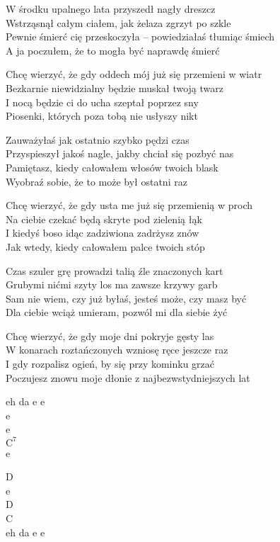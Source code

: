 \begin{text}
    \small{
    \hfill\break
W środku upalnego lata przyszedł nagły dreszcz\\
Wstrząsnął całym ciałem, jak żelaza zgrzyt po szkle\\
Pewnie śmierć cię przeskoczyła – powiedziałaś tłumiąc śmiech\\
A ja poczułem, że to mogła być naprawdę śmierć

Chcę wierzyć, że gdy oddech mój już się przemieni w wiatr\\
Bezkarnie niewidzialny będzie muskał twoją twarz\\
I nocą będzie ci do ucha szeptał poprzez sny\\
Piosenki, których poza tobą nie usłyszy nikt

Zauważyłaś jak ostatnio szybko pędzi czas\\
Przyspieszył jakoś nagle, jakby chciał się pozbyć nas\\
Pamiętasz, kiedy całowałem włosów twoich blask\\
Wyobraź sobie, że to może był ostatni raz

Chcę wierzyć, że gdy usta me już się przemienią w proch\\
Na ciebie czekać będą skryte pod zielenią łąk\\
I kiedyś boso idąc zadziwiona zadrżysz znów\\
Jak wtedy, kiedy całowałem palce twoich stóp

Czas szuler grę prowadzi talią źle znaczonych kart\\
Grubymi nićmi szyty los ma zawsze krzywy garb\\
Sam nie wiem, czy już byłaś, jesteś może, czy masz być\\
Dla ciebie wciąż umieram, pozwól mi dla siebie żyć

Chcę wierzyć, że gdy moje dni pokryje gęsty las\\
W konarach roztańczonych wzniosę ręce jeszcze raz\\
I gdy rozpalisz ogień, by się przy kominku grzać\\
Poczujesz znowu moje dłonie z najbezwstydniejszych lat
    }
\end{text}
\begin{chord}
    \small{
    eh da e e\\
    e\\
    e\\
    $\mathrm{C^7}$\\
    \hfill\break
    e

    D\\
    e\\
    D\\
    C\\
    eh da e e
    }
\end{chord}
